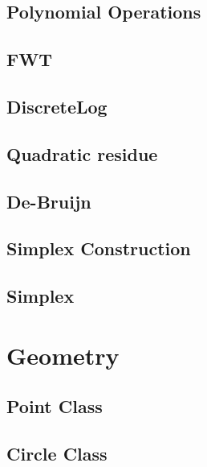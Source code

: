 \documentclass[a4paper,10pt,twocolumn,oneside]{article}
\begin{document}
\subsection{Polynomial Operations}

% 
% 
\subsection{FWT}

\subsection{DiscreteLog}

\subsection{Quadratic residue}

\subsection{De-Bruijn}

\subsection{Simplex Construction}

\subsection{Simplex}


\section{Geometry}
\subsection{Point Class}

\subsection{Circle Class}

\end{document}
